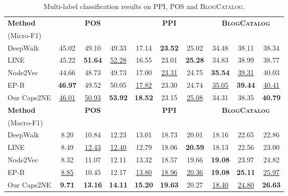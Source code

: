\documentclass[sigconf]{acmart}
\begin{document}
\begin{table*}
\centering
\caption{Multi-label classification results on PPI, POS and \textsc{BlogCatalog}.}
\def\arraystretch{1.2}
\begin{tabular}{l|ccc|ccc|ccc}
\hline
\bf Method & \multicolumn{3}{c|}{\bf POS} & \multicolumn{3}{c|}{\bf PPI} & \multicolumn{3}{c}{\bf \textsc{BlogCatalog}}\\
\cline{2-10}
(Micro-F1) &  &  &  &  &  &  &  &  & \\
\hline
DeepWalk &  45.02 &  49.10 &  49.33  & 17.14   & \textbf{23.52}  & 25.02  & 34.48   & 38.11   & 38.34 \\
LINE  & 45.22  & \textbf{51.64}  & \underline{52.28}  & 16.55   & 23.01   & \textbf{25.28} & 34.83   & 38.99   & 38.77 \\
Node2Vec  & 44.66   & 48.73   & 49.73   & 17.00  & \underline{23.31} & 24.75  & \textbf{35.54}   & \underline{39.31}  & 40.03 \\
EP-B  & \textbf{46.97}  &  49.52   & 50.05   & \underline{17.82} & 23.30  &  24.74  & \underline{35.05}   & \textbf{39.44}  & \underline{40.41}\\
\hline
Our Caps2NE  & \underline{46.01} & \underline{50.93} & \textbf{53.92} & \textbf{18.52} & 23.15  & \underline{25.08} & 34.31  & 38.35  & \textbf{40.79}\\
\hline
\hline
{\bf Method}& \multicolumn{3}{c|}{\bf POS} & \multicolumn{3}{c|}{\bf PPI}  &\multicolumn{3}{c}{\bf \textsc{BlogCatalog}}\\
\cline{2-10}
(Macro-F1) &  &  &  &  &  &  &  &  & \\
\hline
DeepWalk & 8.20   & 10.84   & 12.23  & 13.01  &  18.73  & 20.01  & 18.16  &  22.65   & 22.86 \\
LINE & 8.49   & \underline{12.43}  & \underline{12.40}  & 12,79   & 18.06  &  \textbf{20.59} & 18.13   & 22.56  &  23.00 \\
Node2Vec & 8.32  &  11.07   & 12.11  &  13.32   & 18.57   & 19.66  & \textbf{19.08}  & 23.97   & 24.82 \\
EP-B & \underline{8.85} & 10.45   & 12.17  &  \underline{13.80} & \underline{18.96} & \underline{20.36} & \textbf{19.08}  &  \textbf{25.11}  & \underline{25.97} \\
\hline
Our Caps2NE & \textbf{9.71} & \textbf{13.16} & \textbf{14.11} & \textbf{15.20} & \textbf{19.63} & 20.27  & \underline{18.40}   & \underline{24.80} & \textbf{26.63}\\
\hline
\end{tabular}
\label{tab:posppi}
\end{table*}
\end{document}
